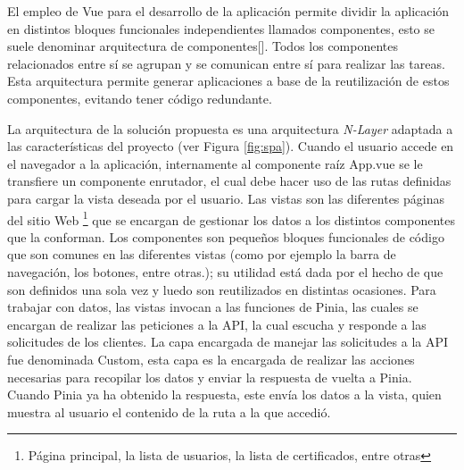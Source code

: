 El empleo de Vue para el desarrollo de la aplicación permite dividir la aplicación en distintos bloques funcionales independientes llamados componentes, esto se suele denominar arquitectura de componentes[\cite{50}]. Todos los componentes relacionados entre sí se agrupan y se comunican entre sí para realizar las tareas. Esta arquitectura permite generar aplicaciones a base de la reutilización de estos componentes, evitando tener código redundante.

La arquitectura de la solución propuesta es una arquitectura \textit{N-Layer} adaptada a las características del proyecto (ver Figura \ref{fig:spa}). Cuando el usuario accede en el navegador a la aplicación, internamente al componente raíz App.vue se le transfiere un componente enrutador, el cual debe hacer uso de las rutas definidas para cargar la vista deseada por el usuario. Las vistas son las diferentes páginas del sitio Web \footnote{Página principal, la lista de usuarios, la lista de certificados, entre otras} que se encargan de gestionar los datos a los distintos componentes que la conforman. Los componentes son pequeños bloques funcionales de código que son comunes en las diferentes vistas (como por ejemplo la barra de navegación, los botones, entre otras.); su utilidad está dada por el hecho de que son definidos una sola vez y luedo son reutilizados en distintas ocasiones. Para trabajar con datos, las vistas invocan a las funciones de Pinia, las cuales se encargan de realizar las peticiones a la API, la cual escucha y responde a las solicitudes de los clientes. La capa encargada de manejar las solicitudes a la API fue denominada Custom, esta capa es la encargada de realizar las acciones necesarias para recopilar los datos y enviar la respuesta de vuelta a Pinia. Cuando Pinia ya ha obtenido la respuesta, este envía los datos a la vista, quien muestra al usuario el contenido de la ruta a la que accedió.



